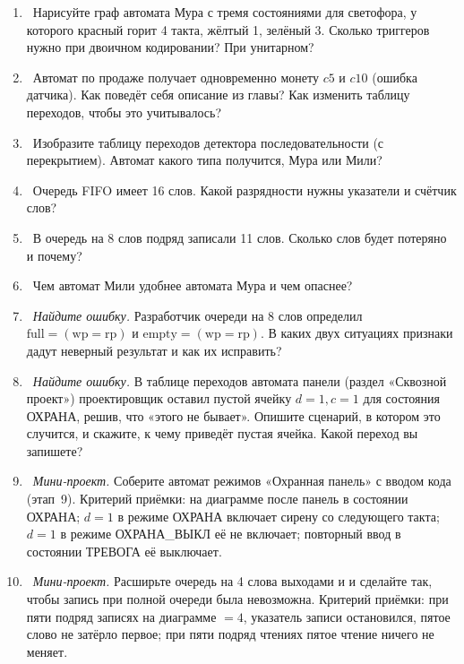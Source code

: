 \begin{taskbox}
\begin{enumerate}
  \item {}~Нарисуйте граф автомата Мура с тремя состояниями для светофора, у
        которого красный горит 4 такта, жёлтый 1, зелёный 3. Сколько триггеров
        нужно при двоичном кодировании? При унитарном?
  \item {}~Автомат по продаже получает одновременно монету $c5$ и $c10$ (ошибка
        датчика). Как поведёт себя описание из главы? Как изменить таблицу
        переходов, чтобы это учитывалось?
  \item {}~Изобразите таблицу переходов детектора последовательности 
        (с перекрытием). Автомат какого типа получится, Мура или Мили?
  \item {}~Очередь FIFO имеет 16 слов. Какой разрядности нужны указатели и
        счётчик слов?
  \item {}~В очередь на 8 слов подряд записали 11 слов. Сколько слов будет
        потеряно и почему?
  \item {}~Чем автомат Мили удобнее автомата Мура и чем опаснее?
  \item {}~\emph{Найдите ошибку.} Разработчик очереди на 8 слов определил
        $\text{full}=(\text{wp}=\text{rp})$ и $\text{empty}=(\text{wp}=\text{rp})$. В каких
        двух ситуациях признаки дадут неверный результат и как их исправить?
  \item {}~\emph{Найдите ошибку.} В таблице переходов автомата панели
        (раздел «Сквозной проект») проектировщик оставил пустой ячейку
        $d{=}1,c{=}1$ для состояния ОХРАНА, решив, что «этого не бывает». Опишите
        сценарий, в котором это случится, и скажите, к чему приведёт пустая
        ячейка. Какой переход вы запишете?
  \item {}~\emph{Мини-проект.} Соберите автомат режимов «Охранная панель»
        с вводом кода  (этап~9). Критерий приёмки: на диаграмме
        после  панель в состоянии ОХРАНА; $d=1$ в режиме ОХРАНА
        включает сирену со следующего такта; $d=1$ в режиме ОХРАНА\_ВЫКЛ её не
        включает; повторный ввод  в состоянии ТРЕВОГА её выключает.
  \item {}~\emph{Мини-проект.} Расширьте очередь на 4 слова выходами
         и  и сделайте так, чтобы запись при полной
        очереди была невозможна. Критерий приёмки: при пяти подряд записях
        на диаграмме $=4$, указатель записи остановился, пятое слово не
        затёрло первое; при пяти подряд чтениях пятое чтение ничего не меняет.
\end{enumerate}
\end{taskbox}

